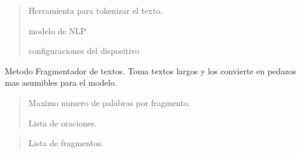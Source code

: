 \documentclass[letterpaper,10pt,english]{sphinxmanual}
\begin{document}
\begin{fulllineitems}
\begin{fulllineitems}
\begin{description}
\begin{quote}\begin{description}
\sphinxAtStartPar
Herramienta para tokenizar el texto.

\sphinxAtStartPar
modelo de NLP

\sphinxAtStartPar
configuraciones del dispositivo

\end{description}\end{quote}

\end{description}

\end{fulllineitems}


\begin{fulllineitems}
\label{\detokenize{Summarizer:Summarizer.ATSM.chunker}}
\pysigstartsignatures
{}
\pysigstopsignatures
\sphinxAtStartPar
Metodo Fragmentador de textos. Toma textos largos y los convierte en pedazos mas asumibles para el modelo.
\begin{description}
\begin{quote}\begin{description}
\sphinxAtStartPar
Maximo numero de palabras por fragmento.

\sphinxAtStartPar
Lista de oraciones.

\end{description}\end{quote}

\begin{quote}\begin{description}
\sphinxAtStartPar
Lista de fragmentos.

\end{description}\end{quote}

\end{description}

\end{fulllineitems}



\end{fulllineitems}
\end{document}
